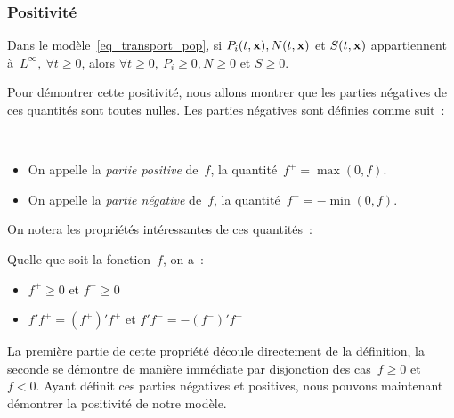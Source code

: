 \documentclass[main.tex]{subfiles}
\begin{document}
\subsubsection{Positivité}
\begin{prop}\label{prop:positivite_modele}
Dans le modèle~\eqref{eq_transport_pop}, si
 $P_i(t,\mathbf{x}), N(t,\mathbf{x}) $ et $S(t,\mathbf{x})$ appartiennent à~$L^\infty, \ \forall t \geq 0$, 
alors $ \forall t\geq 0, \ P_i \geq 0, N \geq 0$ et $S\geq 0.$
\end{prop}
Pour démontrer cette positivité, nous allons montrer que les parties négatives de ces quantités sont toutes nulles. Les parties négatives sont définies comme suit~:
\begin{dfn}~
\begin{itemize}
\item On appelle la \emph{partie positive} de~$f$, la quantité~$f^+=\max(0,f)$.
\item On appelle la \emph{partie négative} de~$f$, la quantité~$f^-=-\min(0,f)$.
\end{itemize}
\end{dfn}
On notera les propriétés intéressantes de ces quantités~:
\begin{prop}\label{prop:partie_neg_et_pos}
Quelle que soit la fonction~$f$, on a~:
\begin{itemize}
\item $f^+ \geq 0$ et $f^- \geq 0$
\item  $f'f^+=(f^+)'f^+$  et $f'f^-=-(f^-)'f^-$ 
\end{itemize} 
\end{prop}
La première partie de cette propriété découle directement de la définition, la seconde se démontre de manière immédiate par disjonction des cas~$f\geq0$ et~$f<0$. Ayant définit ces parties négatives et positives, nous pouvons maintenant démontrer la positivité de notre modèle.
\end{document}
